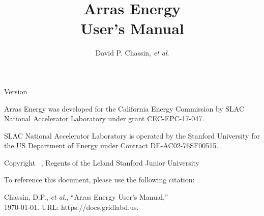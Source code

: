 \documentclass{article}
\title 
{
	\LARGE Arras Energy
\\
	User's Manual
}
\author {
	David P. Chassin, \textit{et al}.
}
\begin{document}
\maketitle

\begin{center}

Version 

\vspace{0.5in}

Arras Energy was developed for the California Energy Commission by SLAC National Accelerator Laboratory under grant CEC-EPC-17-047.

\vspace{0.5in}

SLAC National Accelerator Laboratory is operated by the Stanford University for the US Department of Energy under Contract DE-AC02-76SF00515.

\vspace{0.5in}

Copyright \textcopyright~\the\year, Regents of the Leland Stanford Junior University

\vspace{0.5in}

To reference this document, please use the following citation:

Chassin, D.P., \textit{et al}., ``Arras Energy User's Manual,''\\\today. URL: https://docs.gridlabd.us.

\end{center}


\end{document}
